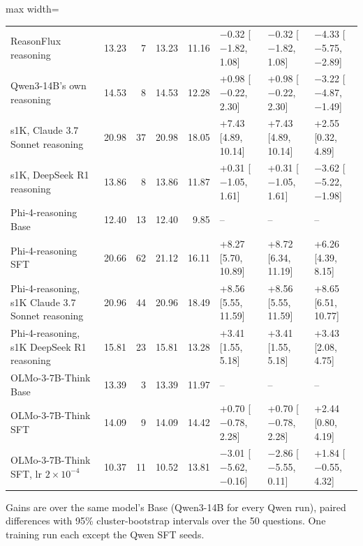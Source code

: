 \begin{table}[t]
\begin{adjustbox}{max width=\linewidth}
\begin{tabular}{lrrrrlll}
ReasonFlux reasoning & 13.23 & 7 & 13.23 & 11.16 & $-$0.32 [$-$1.82, 1.08] & $-$0.32 [$-$1.82, 1.08] & $-$4.33 [$-$5.75, $-$2.89] \\
Qwen3-14B's own reasoning & 14.53 & 8 & 14.53 & 12.28 & +0.98 [$-$0.22, 2.30] & +0.98 [$-$0.22, 2.30] & $-$3.22 [$-$4.87, $-$1.49] \\
s1K, Claude 3.7 Sonnet reasoning & 20.98 & 37 & 20.98 & 18.05 & +7.43 [4.89, 10.14] & +7.43 [4.89, 10.14] & +2.55 [0.32, 4.89] \\
s1K, DeepSeek R1 reasoning & 13.86 & 8 & 13.86 & 11.87 & +0.31 [$-$1.05, 1.61] & +0.31 [$-$1.05, 1.61] & $-$3.62 [$-$5.22, $-$1.98] \\
Phi-4-reasoning Base & 12.40 & 13 & 12.40 & 9.85 & -- & -- & -- \\
Phi-4-reasoning SFT & 20.66 & 62 & 21.12 & 16.11 & +8.27 [5.70, 10.89] & +8.72 [6.34, 11.19] & +6.26 [4.39, 8.15] \\
Phi-4-reasoning, s1K Claude 3.7 Sonnet reasoning & 20.96 & 44 & 20.96 & 18.49 & +8.56 [5.55, 11.59] & +8.56 [5.55, 11.59] & +8.65 [6.51, 10.77] \\
Phi-4-reasoning, s1K DeepSeek R1 reasoning & 15.81 & 23 & 15.81 & 13.28 & +3.41 [1.55, 5.18] & +3.41 [1.55, 5.18] & +3.43 [2.08, 4.75] \\
OLMo-3-7B-Think Base & 13.39 & 3 & 13.39 & 11.97 & -- & -- & -- \\
OLMo-3-7B-Think SFT & 14.09 & 9 & 14.09 & 14.42 & +0.70 [$-$0.78, 2.28] & +0.70 [$-$0.78, 2.28] & +2.44 [0.80, 4.19] \\
OLMo-3-7B-Think SFT, lr $2\times10^{-4}$ & 10.37 & 11 & 10.52 & 13.81 & $-$3.01 [$-$5.62, $-$0.16] & $-$2.86 [$-$5.55, 0.11] & +1.84 [$-$0.55, 4.32] \\
\bottomrule
\end{tabular}
\end{adjustbox}
\par\smallskip\begin{minipage}{0.97\linewidth}\footnotesize Gains are over the same model's Base (Qwen3-14B for every Qwen run), paired differences with 95\% cluster-bootstrap intervals over the 50 questions. One training run each except the Qwen SFT seeds.\end{minipage}
\end{table}

